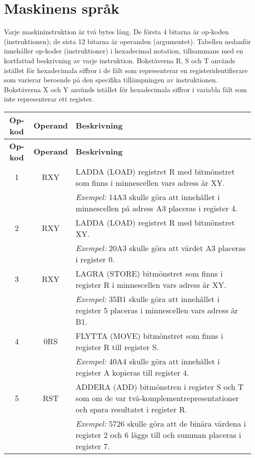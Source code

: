 \section{Maskinens språk}

Varje maskininstruktion är två bytes lång. De första 4 bitarna är op-koden (instruktionen); de sista 12 bitarna är operanden (argumentet). Tabellen nedanför innehåller op-koder (instruktioner) i hexadecimal notation, tillsammans med en kortfattad beskrivning av varje instruktion. Bokstäverna R, S och T används istället för hexadecimala siffror i de fält som representerar en registeridentifierare som varierar beroende på den specifika tillämpningen av instruktionen. Bokstäverna X och Y används istället för hexadecimala siffror i variabla fält som inte representerar ett register.

\begin{longtable}{|c|c|p{10cm}|}
\hline
\textbf{Op-kod} & \textbf{Operand} & \textbf{Beskrivning} \\
\hline
\endfirsthead
\hline
\textbf{Op-kod} & \textbf{Operand} & \textbf{Beskrivning} \\
\hline
\endhead
1 & RXY & LADDA (LOAD) registret R med bitmönstret som finns i minnescellen vars adress är XY. \\
  &     & \textit{Exempel:} 14A3 skulle göra att innehållet i minnescellen på adress A3 placeras i register 4. \\
\hline
2 & RXY & LADDA (LOAD) registret R med bitmönstret XY. \\
  &     & \textit{Exempel:} 20A3 skulle göra att värdet A3 placeras i register 0. \\
\hline
3 & RXY & LAGRA (STORE) bitmönstret som finns i register R i minnescellen vars adress är XY. \\
  &     & \textit{Exempel:} 35B1 skulle göra att innehållet i register 5 placeras i minnescellen vars adress är B1. \\
\hline
4 & 0RS & FLYTTA (MOVE) bitmönstret som finns i register R till register S. \\
  &     & \textit{Exempel:} 40A4 skulle göra att innehållet i register A kopieras till register 4. \\
\hline
5 & RST & ADDERA (ADD) bitmönstren i register S och T som om de var två-komplementrepresentationer och spara resultatet i register R. \\
  &     & \textit{Exempel:} 5726 skulle göra att de binära värdena i register 2 och 6 läggs till och summan placeras i register 7. \\

\end{longtable}

